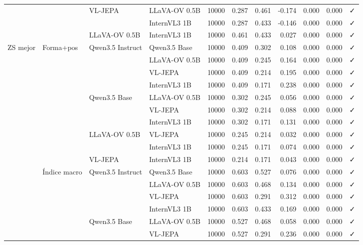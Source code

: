 \begin{tabular}{llllrrrrrrl}
\cline{3-11}
 &  & \multirow[t]{2}{*}{VL-JEPA} & LLaVA-OV 0.5B & 10000 & 0.287 & 0.461 & -0.174 & 0.000 & 0.000 & ✓ \\
 &  &  & InternVL3 1B & 10000 & 0.287 & 0.433 & -0.146 & 0.000 & 0.000 & ✓ \\
\cline{3-11}
 &  & LLaVA-OV 0.5B & InternVL3 1B & 10000 & 0.461 & 0.433 & 0.027 & 0.000 & 0.000 & ✓ \\
\cline{1-11} \cline{2-11} \cline{3-11}
\multirow[t]{20}{*}{ZS mejor} & \multirow[t]{10}{*}{Forma+pos} & \multirow[t]{4}{*}{Qwen3.5 Instruct} & Qwen3.5 Base & 10000 & 0.409 & 0.302 & 0.108 & 0.000 & 0.000 & ✓ \\
 &  &  & LLaVA-OV 0.5B & 10000 & 0.409 & 0.245 & 0.164 & 0.000 & 0.000 & ✓ \\
 &  &  & VL-JEPA & 10000 & 0.409 & 0.214 & 0.195 & 0.000 & 0.000 & ✓ \\
 &  &  & InternVL3 1B & 10000 & 0.409 & 0.171 & 0.238 & 0.000 & 0.000 & ✓ \\
\cline{3-11}
 &  & \multirow[t]{3}{*}{Qwen3.5 Base} & LLaVA-OV 0.5B & 10000 & 0.302 & 0.245 & 0.056 & 0.000 & 0.000 & ✓ \\
 &  &  & VL-JEPA & 10000 & 0.302 & 0.214 & 0.088 & 0.000 & 0.000 & ✓ \\
 &  &  & InternVL3 1B & 10000 & 0.302 & 0.171 & 0.131 & 0.000 & 0.000 & ✓ \\
\cline{3-11}
 &  & \multirow[t]{2}{*}{LLaVA-OV 0.5B} & VL-JEPA & 10000 & 0.245 & 0.214 & 0.032 & 0.000 & 0.000 & ✓ \\
 &  &  & InternVL3 1B & 10000 & 0.245 & 0.171 & 0.074 & 0.000 & 0.000 & ✓ \\
\cline{3-11}
 &  & VL-JEPA & InternVL3 1B & 10000 & 0.214 & 0.171 & 0.043 & 0.000 & 0.000 & ✓ \\
\cline{2-11} \cline{3-11}
 & \multirow[t]{10}{*}{Índice macro} & \multirow[t]{4}{*}{Qwen3.5 Instruct} & Qwen3.5 Base & 10000 & 0.603 & 0.527 & 0.076 & 0.000 & 0.000 & ✓ \\
 &  &  & LLaVA-OV 0.5B & 10000 & 0.603 & 0.468 & 0.134 & 0.000 & 0.000 & ✓ \\
 &  &  & VL-JEPA & 10000 & 0.603 & 0.291 & 0.312 & 0.000 & 0.000 & ✓ \\
 &  &  & InternVL3 1B & 10000 & 0.603 & 0.433 & 0.169 & 0.000 & 0.000 & ✓ \\
\cline{3-11}
 &  & \multirow[t]{3}{*}{Qwen3.5 Base} & LLaVA-OV 0.5B & 10000 & 0.527 & 0.468 & 0.058 & 0.000 & 0.000 & ✓ \\
 &  &  & VL-JEPA & 10000 & 0.527 & 0.291 & 0.236 & 0.000 & 0.000 & ✓ \\

\end{tabular}
